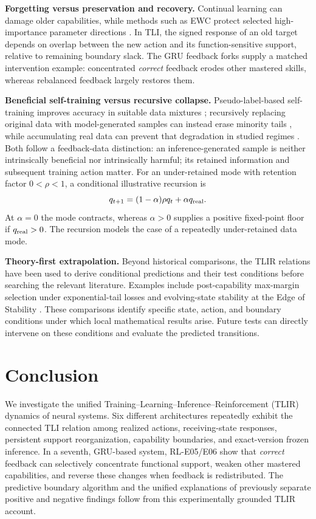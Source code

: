 \documentclass{article}
\begin{document}
\noindent\textbf{Forgetting versus preservation and recovery.}
Continual learning can damage older capabilities, while methods such as EWC protect selected high-importance parameter directions \cite{kirkpatrick2017}. In TLI, the signed response of an old target depends on overlap between the new action and its function-sensitive support, relative to remaining boundary slack. The GRU feedback forks supply a matched intervention example: concentrated \emph{correct} feedback erodes other mastered skills, whereas rebalanced feedback largely restores them. 

\noindent\textbf{Beneficial self-training versus recursive collapse.}
Pseudo-label-based self-training improves accuracy in suitable data mixtures \cite{xie2020}; recursively replacing original data with model-generated samples can instead erase minority tails \cite{shumailov2024}, while accumulating real data can prevent that degradation in studied regimes \cite{gerstgrasser2024}. Both follow a feedback-data distinction: an inference-generated sample is neither intrinsically beneficial nor intrinsically harmful; its retained information and subsequent training action matter. For an under-retained mode with retention factor $0<\rho<1$, a conditional illustrative recursion is
\begin{equation}
 q_{t+1}=(1-\alpha)\rho q_t+\alpha q_{\rm real}.
 \label{eq:feedback}
\end{equation}
At $\alpha=0$ the mode contracts, whereas $\alpha>0$ supplies a positive fixed-point floor if $q_{\rm real}>0$. The recursion models the case of a repeatedly under-retained data mode.

\noindent\textbf{Theory-first extrapolation.}
Beyond historical comparisons, the TLIR relations have been used to derive conditional predictions and their test conditions before searching the relevant literature. Examples include post-capability max-margin selection under exponential-tail losses \cite{soudry2018} and evolving-state stability at the Edge of Stability \cite{cohen2021}. These comparisons identify specific state, action, and boundary conditions under which local mathematical results arise. Future tests can directly intervene on these conditions and evaluate the predicted transitions.

\section{Conclusion}
We investigate the unified Training--Learning--Inference--Reinforcement (TLIR) dynamics of neural systems. Six different architectures repeatedly exhibit the connected TLI relation among realized actions, receiving-state responses, persistent support reorganization, capability boundaries, and exact-version frozen inference. In a seventh, GRU-based system, RL-E05/E06 show that \emph{correct} feedback can selectively concentrate functional support, weaken other mastered capabilities, and reverse these changes when feedback is redistributed. The predictive boundary algorithm and the unified explanations of previously separate positive and negative findings follow from this experimentally grounded TLIR account.
\end{document}
